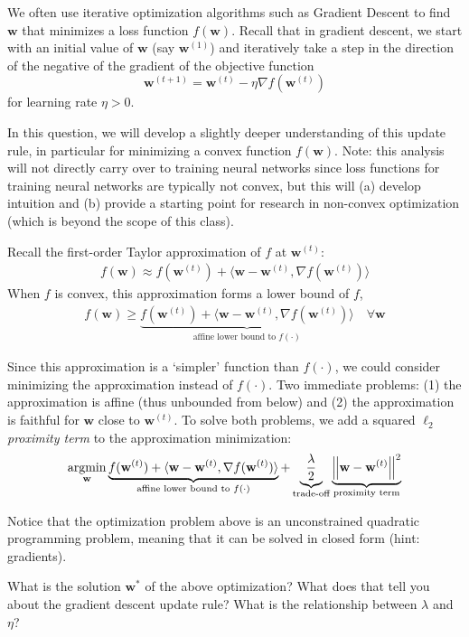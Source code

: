 
We often use iterative optimization algorithms such as Gradient Descent to
find $\mathbf{w}$ that minimizes a loss function $f(\mathbf{w})$. Recall that in gradient descent,
we start with an initial value of $\mathbf{w}$ (say $\mathbf{w}^{(1)}$) and iteratively take a step in the direction
of the negative of the gradient of the objective function \ie
%
\begin{equation}
\mathbf{w}^{(t+1)} = \mathbf{w}^{(t)} - \eta\nabla f(\mathbf{w}^{(t)})
\end{equation}
%
for learning rate $\eta > 0$.

In this question, we will develop a slightly deeper understanding of this update rule, in particular for 
minimizing a convex function $f(\mathbf{w})$. Note: this analysis will not directly carry over to training neural networks 
since loss functions for training neural networks are typically not convex, but this will (a) develop intuition 
and (b) provide a starting point for research in non-convex optimization (which is beyond the scope of this class). 


Recall the first-order Taylor approximation of $f$ at $\mathbf{w}^{(t)}$:
%
\begin{align}\label{first-order-approx}
f(\mathbf{w}) \approx f(\mathbf{w}^{(t)}) + \langle \mathbf{w}-\mathbf{w}^{(t)},
\nabla f(\mathbf{w}^{(t)}) \rangle
\end{align}
%
When $f$ is convex, this approximation forms a lower bound of $f$, \ie 
\begin{align}
f(\mathbf{w}) \ge 
\underbrace{
f(\mathbf{w}^{(t)}) + \langle \mathbf{w}-\mathbf{w}^{(t)}, 
\nabla f(\mathbf{w}^{(t)}) \rangle
}_{\text{affine lower bound to $f(\cdot)$}}
 \quad \forall \mathbf{w}
\end{align}
%

Since this approximation
is a `simpler' function than $f(\cdot)$, we could consider minimizing the approximation instead of $f(\cdot)$.
Two immediate problems: (1) the approximation is affine (thus unbounded from below) and
(2) the approximation is faithful for $\mathbf{w}$ close to $\mathbf{w}^{(t)}$.
To solve both problems, we add a squared $\ell_2$ \emph{proximity term} to the approximation minimization:
%
\begin{equation}
\mathop{\mathrm{argmin}}_\mathbf{w}
\underbrace{
f(\mathbf{w}^{(t)}) + \langle \mathbf{w}-\mathbf{w}^{(t)}, \nabla f(\mathbf{w}^{(t)}) \rangle
}_{\text{affine lower bound to $f(\cdot)$}}
+
\underbrace{
\frac{\lambda}{2}
}_{\text{trade-off}}
\underbrace{
\left| \hspace{-0.7pt}\left|\mathbf{w} - \mathbf{w}^{(t)}\right| \hspace{-0.7pt}\right|^2
}_{\text{proximity term}}
\end{equation}
%

Notice that the optimization problem above is an unconstrained quadratic programming problem,
meaning that it can be solved in closed form (hint: gradients).

What is the solution $\mathbf{w}^*$ of the above optimization?
What does that tell you about the gradient descent update rule?
What is the relationship between $\lambda$ and $\eta$?
